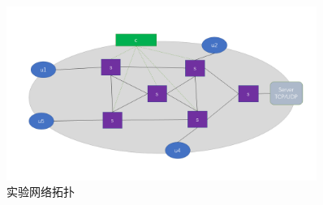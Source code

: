 \begin{figure}[h]
	\centering
	\includegraphics[width=0.9\textwidth]{image/raw_topo.png}
	\caption{实验网络拓扑}
 	\label{fig:topo}
\end{figure}